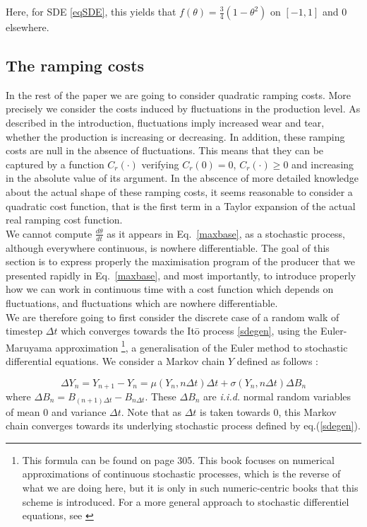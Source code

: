 Here, for SDE \ref{eqSDE}, this yields that $f(\theta)=\frac{3}{4}(1-\theta^2)$ on $[-1,1]$ and $0$ elsewhere.\\

\subsection{The ramping costs}
\label{sec_ramping_costs}
In the rest of the paper we are going to consider quadratic ramping costs. More precisely we consider the costs induced by fluctuations in the production level. As described in the introduction, fluctuations imply increased wear and tear, whether the production is increasing or decreasing. In addition, these ramping costs are null in the absence of fluctuations. This means that they can be captured by a function $C_r(\cdot)$ verifying $C_r(0)=0$, $C_r(\cdot)\geq0$ and increasing in the absolute value of its argument. In the abscence of more detailed knowledge about the actual shape of these ramping costs, it seems reasonable to consider a quadratic cost function, that is the first term in a Taylor expansion of the actual real ramping cost function. \\

We cannot compute $\frac{d\theta}{dt}$ as it appears in Eq.~\ref{maxbase}, as a stochastic process, although everywhere continuous, is nowhere differentiable. The goal of this section is to express properly the maximisation program of the producer that we presented rapidly in Eq.~\ref{maxbase}, and most importantly, to introduce properly how we can work in continuous time with a cost function which depends on fluctuations, and fluctuations which are nowhere differentiable.\\

We are therefore going to first consider the discrete case of a random walk of timestep $\Delta t$ which converges towards the It\={o} process \ref{sdegen}, using the Euler-Maruyama approximation \cite{kloeden2011numerical}\footnote{This formula can be found on page 305. This book focuses on numerical approximations of continuous stochastic processes, which is the reverse of what we are doing here, but it is only in such numeric-centric books that this scheme is introduced. For a more general approach to stochastic differentiel equations, see \cite{oksendal2003stochastic}}, a generalisation of the Euler method to stochastic differential equations. We consider a Markov chain $Y$ defined as follows : 

\begin{equation}
\Delta Y_n=Y_{n+1}-Y_n= \mu(Y_n,n \Delta t)\Delta t+\sigma (Y_n,n \Delta t)\Delta B_n
\end{equation}
where $\Delta B_n=B_{(n+1)\Delta t}-B_{n\Delta t}$. These $\Delta B_n$ are \emph{i.i.d.} normal random variables of mean $0$ and variance $\Delta t$. Note that as $\Delta t$ is taken towards $0$, this Markov chain converges towards its underlying stochastic process defined by eq.(\ref{sdegen}).\\

